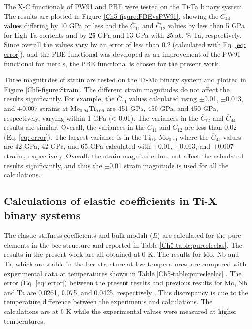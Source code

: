 The X-C functionals of PW91 and PBE were tested on the Ti-Ta binary system. The results are plotted in Figure \ref{Ch5-figure:PBEvsPW91}, showing the $\overline{C}_{44}$ values differing by 10 GPa or less and the $\overline{C}_{11}$ and $\overline{C}_{12}$ values by less than 5 GPa for high Ta contents and by 26 GPa and 13 GPa with 25 at. \% Ta, respectively. Since overall the values vary by an error of less than 0.2 (calculated with Eq. \ref{eq: error}), and the PBE functional was developed as an improvement of the PW91 functional for metals, the PBE functional is chosen for the present work. 

Three magnitudes of strain are tested on the Ti-Mo binary system and plotted in Figure \ref{Ch5-figure:Strain}. The different strain magnitudes do not affect the results significantly. For example, the $\overline{C}_{11}$ values calculated using $\pm$0.01, $\pm$0.013, and $\pm$0.007 strains at Mo$_{0.94}$Ti$_{0.06}$ are 451 GPa, 450 GPa, and 450 GPa, respectively, varying within 1 GPa (< 0.01). The variances in the $\overline{C}_{12}$ and $\overline{C}_{44}$ results are similar. Overall, the variances in the $\overline{C}_{11}$ and $\overline{C}_{12}$ are less than 0.02 (Eq. \ref{eq: error}). The largest variance is in the Ti$_{0.50}$Mo$_{0.50}$ where the $\overline{C}_{44}$ values are 42 GPa, 42 GPa, and 65 GPa calculated with $\pm$0.01, $\pm$0.013, and $\pm$0.007 strains, respectively. Overall, the strain magnitude does not affect the calculated results significantly, and thus the $\pm$0.01 strain magnitude is used for all the calculations.

\subsection{Calculations of elastic coefficients in Ti-X binary systems}

The elastic stiffness coefficients and bulk moduli ($B$) are calculated for the pure elements in the bcc structure and reported in Table \ref{Ch5-table:pureeleelas}. The results in the present work are all obtained at 0 K. The results for Mo, Nb and Ta, which are stable in the bcc structure at low temperatures, are compared with experimental data at temperatures shown in Table \ref{Ch5-table:pureeleelas} \cite{Dickinson1967a,Bolef1961}. The error (Eq. \ref{eq: error}) between the present results and previous results for Mo, Nb and Ta are 0.0261, 0.075, and 0.0425, respectively \cite{Simmons1971b,Dickinson1967a,Bolef1961}. This discrepancy is due to the temperature difference between the experiments and calculations. The calculations are at 0 K while the experimental values were measured at higher temperatures. 

